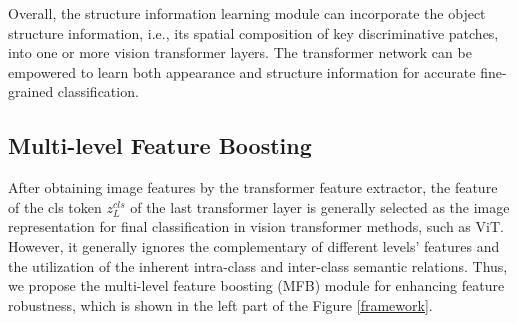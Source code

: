 \documentclass[sigconf, nonacm]{acmart}
\begin{document}
Overall, the structure information learning module can incorporate the object structure information, i.e., its spatial composition of key discriminative patches, into one or more vision transformer layers. The transformer network can be empowered to learn both appearance and structure information for accurate fine-grained classification.

\subsection{Multi-level Feature Boosting}\label{MFB}

After obtaining image features by the transformer feature extractor, the feature of the cls token $z_L^{cls}$ of the last transformer layer is generally selected as the image representation for final classification in vision transformer methods, such as ViT. However, it generally ignores the complementary of different levels’ features and the utilization of the inherent intra-class and inter-class semantic relations. Thus, we propose the multi-level feature boosting (MFB) module for enhancing feature robustness, which is shown in the left part of the Figure \ref{framework}.
\end{document}
